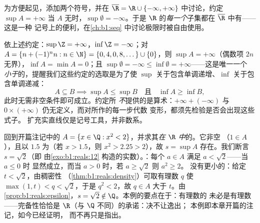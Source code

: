 \begin{remark}[扩充实直线]
为方便起见，添加两个符号，并在 $\overline\R = \R
\cup \{-\infty, +\infty\}$ 中讨论，约定 $\sup A = +\infty$
当 $A$ 无时，$\sup \emptyset = -\infty$。于是
$\R$ 的\emph{每一个}子集都在 $\overline\R$ 中有——这是一种
记号上的便利，在\cref{ch:b1:seq} 中讨论极限时被自由使用。
\end{remark}

\begin{example}\label{ex:b1:reals:extendedcompute}
依上述约定：$\sup \Z = +\infty$，$\inf \Z =
-\infty$；对 $A = \{n + (-1)^n n : n \in \N\} = \{0, 4, 0, 8,
\dots\} \cup \{0\}$，则 $\sup A = +\infty$（偶数项 $2n$
无界），$\inf A = \min A = 0$；且 $\sup\emptyset =
-\infty \leq \inf\emptyset = +\infty$——这是唯一一个
\emph{小于}的，提醒我们这些约定的选取是为了使
$\sup$ 关于包含单调递增、$\inf$
关于包含单调递减：
\[
A \subseteq B \implies \sup A \leq \sup B
\quad\text{且}\quad \inf A \geq \inf B ,
\]
此时无需非空条件即可成立。约定所
\emph{不}提供的是算术：$+\infty + (-\infty)$ 与 $0
\times (+\infty)$ 仍无定义，而对所作的每一步代数
变形，都须先检验是否会出现这些式子。
扩充实直线仅是记号工具，并非数系。
\end{example}

\begin{example}[逸出 $\Q$ 的上确界]\label{ex:b1:reals:supescape}
回到开篇注记中的 $A = \{x \in \Q : x^2 <
2\}$，并求其\emph{在 $\R$ 中}的。它非空
（$1 \in A$），且以 $1.5$ 为（若 $x > 1.5$，则 $x^2 >
2.25 > 2$），故 $s = \sup A$ 存在。我们断言 $s = \sqrt 2$（即
由\cref{exo:b1:reals:12} 构造的实数）。：每个
$a \in A$ 满足 $a < \sqrt2$——当 $a \leq 0$ 时
显然成立，而当 $a > 0$ 时，若 $a \geq \sqrt2$ 则 $a^2 \geq 2$。
没有更小的：给定 $t < \sqrt2$，由稠密性
（\cref{thm:b1:reals:density}）可取有理数 $q$ 使
$\max(1, t) < q < \sqrt 2$，于是 $q^2 < 2$，故 $q \in A$
大于 $t$。由\cref{prop:b1:reals:epsilon}，$s = \sqrt2
\notin \Q$。本例的要点在于：有理数的
未必是有理数——完备性恰恰是
$\R$（与 $\Q$ 不同）的承诺：决不让逸出；
本例即本章开篇的注记，如今已经证明，
而不再只是指出。
\end{example}

